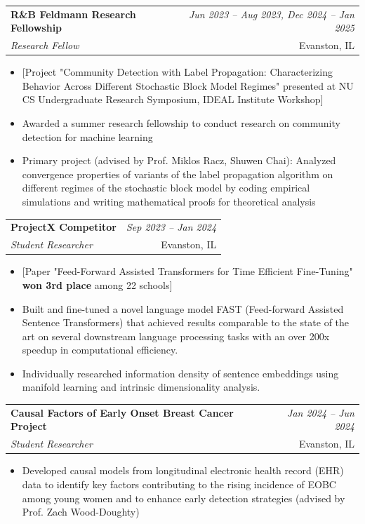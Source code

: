 \documentclass[a4paper,11pt]{article}
\makeatletter
\newcommand{\resumeSubheading}[4]{
\vspace{0.5mm}\item
    \begin{tabular*}{0.98\textwidth}[t]{l@{\extracolsep{\fill}}r}
        \textbf{#1} & \textit{\footnotesize{#4}} \\
        \textit{\footnotesize{#3}} &  \footnotesize{#2}\\
    \end{tabular*}
    \vspace{-2.4mm}
}
\newcommand{\resumeItemListStart}{\begin{itemize}[leftmargin=*,labelsep=1mm,itemsep=0.5mm]}
\newcommand{\resumeItemListEnd}{\end{itemize}\vspace{-2mm}}
\makeatother
\begin{document}
\resumeSubheading
    {R\&B Feldmann Research Fellowship}{Evanston, IL}
    {Research Fellow}{Jun 2023 – Aug 2023, Dec 2024 – Jan 2025}
    \resumeItemListStart
      \item $[$Project "Community Detection with Label Propagation: Characterizing Behavior Across Different Stochastic Block Model Regimes" presented at NU CS Undergraduate Research Symposium, IDEAL Institute Workshop$]$
      \item Awarded a summer research fellowship to conduct research on community detection for machine learning
      \item Primary project (advised by Prof. Miklos Racz, Shuwen Chai): Analyzed convergence properties of variants of the label propagation algorithm on different regimes of the stochastic block model by coding empirical simulations and writing mathematical proofs for theoretical analysis
    \resumeItemListEnd
    
\resumeSubheading
    {ProjectX Competitor}{Evanston, IL}
    {Student Researcher}{Sep 2023 – Jan 2024}
    \resumeItemListStart
      \item $[$Paper "Feed-Forward Assisted Transformers for Time Efficient Fine-Tuning" \textbf{won 3rd place} among 22 schools$]$
      \item Built and fine-tuned a novel language model FAST (Feed-forward Assisted Sentence Transformers) that achieved results comparable to the state of the art on several downstream language processing tasks with an over 200x speedup in computational efficiency. 
      \item Individually researched information density of sentence embeddings using manifold learning and intrinsic dimensionality analysis.
    \resumeItemListEnd

\resumeSubheading
    {Causal Factors of Early Onset Breast Cancer Project}{Evanston, IL}
    {Student Researcher}{Jan 2024 – Jun 2024}
    \resumeItemListStart
      \item Developed causal models from longitudinal electronic health record (EHR) data to identify key factors contributing to the rising incidence of EOBC among young women and to enhance early detection strategies (advised by Prof. Zach Wood-Doughty)
    \resumeItemListEnd
    
\end{document}
